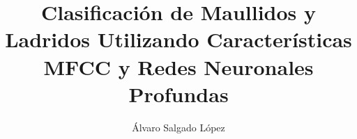 \documentclass[journal]{IEEEtran}
\begin{document}
%
\title{Clasificación de Maullidos y Ladridos Utilizando Características MFCC y Redes Neuronales Profundas}


\author{Álvaro Salgado López}

% 
%














\maketitle
\end{document}
